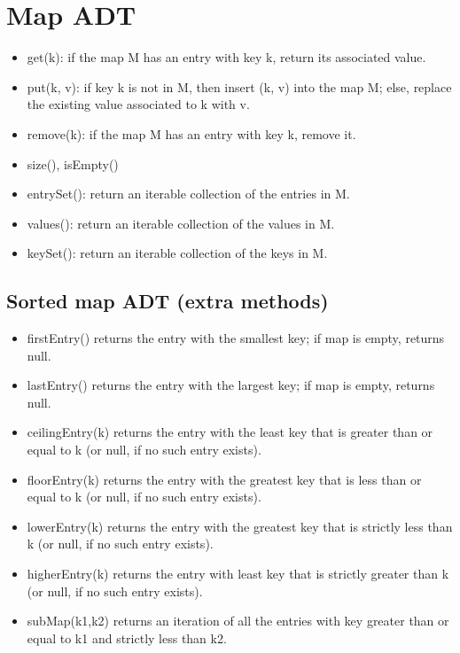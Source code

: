 \documentclass[12pt]{article}
\newcommand{\1}{\space \quad}
\newcommand{\2}{\quad \quad \quad}
\newcommand{\3}{\quad \quad \quad \quad \space}
\newcommand{\4}{\quad \quad \quad \quad \quad \quad}
\begin{document}
\section{Map ADT}
\begin{itemize}
  \item get(k): if the map M has an entry with key k, return its associated value.
  \item put(k, v): if key k is not in M, then insert (k, v) into the map M; else, replace the existing value associated to k with v.
  \item remove(k): if the map M has an entry with key k, remove it.
  \item size(), isEmpty()
  \item entrySet(): return an iterable collection of the entries in M.
  \item values(): return an iterable collection of the values in M.
  \item keySet(): return an iterable collection of the keys in M.
\end{itemize}

\subsection{Sorted map ADT (extra methods)}
\begin{itemize}
  \item firstEntry() returns the entry with the smallest key; if map is empty, returns null.
  \item lastEntry() returns the entry with the largest key; if map is empty, returns null.
  \item ceilingEntry(k) returns the entry with the least key that is greater than or equal to k (or null, if no such entry exists).
  \item floorEntry(k) returns the entry with the greatest key that is less than or equal to k (or null, if no such entry exists).
  \item lowerEntry(k) returns the entry with the greatest key that is strictly less than k (or null, if no such entry exists).
  \item higherEntry(k) returns the entry with least key that is strictly greater than k (or null, if no such entry exists).
  \item subMap(k1,k2) returns an iteration of all the entries with key greater than or equal to k1 and strictly less than k2.
\end{itemize}
\end{document}

